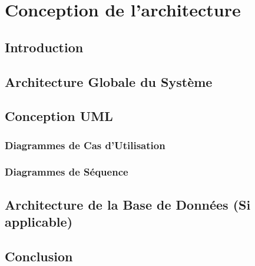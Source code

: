 \chapter{Conception de l'architecture}
\section{Introduction}

\section{Architecture Globale du Système}

\section{Conception UML}
\subsection{Diagrammes de Cas d'Utilisation}
\subsection{Diagrammes de Séquence}

\section{Architecture de la Base de Données (Si applicable)}

\section{Conclusion}
